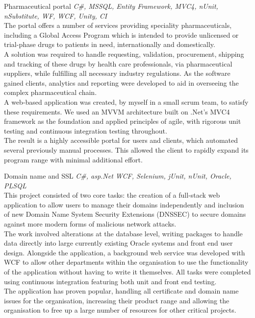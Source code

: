 \documentclass[]{friggeri-cv} %
\begin{document}
\begin{projectentrylist}
\projectentry
{Pharmaceutical portal}
{\emph{C\#, MSSQL, Entity Framework, MVC4, nUnit, nSubstitute, WF, WCF, Unity, CI} \\
The portal offers a number of services providing speciality pharmaceuticals, including
a Global Access Program which is intended to provide unlicensed or trial-phase drugs
to patients in need, internationally and domestically.\\
A solution was required to handle
requesting, validation, procurement, shipping and tracking of these drugs by health care
professionals, via pharmaceutical suppliers, while fulfilling all necessary industry regulations. As the software gained clients, analytics and reporting were developed
to aid in overseeing the complex pharmaceutical chain. \\
A web-based application was created, by myself in a small scrum team, to satisfy these
requirements. We used an MVVM architecture built on .Net’s MVC4 framework as the foundation and applied principles of agile, with rigorous unit testing and continuous integration testing throughout. \\
The result is a highly accessible portal for users and clients, which automated several previously manual processes. This allowed the client to rapidly expand
its program range with minimal additional effort.}

\projectentry
{Domain name and SSL}
{\emph{C\#, asp.Net WCF, Selenium, jUnit, nUnit, Oracle, PLSQL } \\
This project consisted of two core tasks: the creation of a full-stack web application to allow users to manage their domains independently and inclusion of new Domain Name System Security Extensions (DNSSEC) to secure domains against more modern forms of malicious network attacks.
\\
The work involved alterations at the database level, writing packages to handle data directly into large currently existing Oracle systems  and front end user design. Alongside the application, a background web service was developed with WCF to allow other departments within the organisation to use the functionality of the application without having to write it themselves. All tasks were completed using continuous integration featuring both unit and front end testing.
\\
The application has proven popular, handling all certificate and domain name issues for the organisation, increasing their product range and allowing the organisation to free up a large number of resources for other critical projects.}


\end{projectentrylist}
\end{document}
